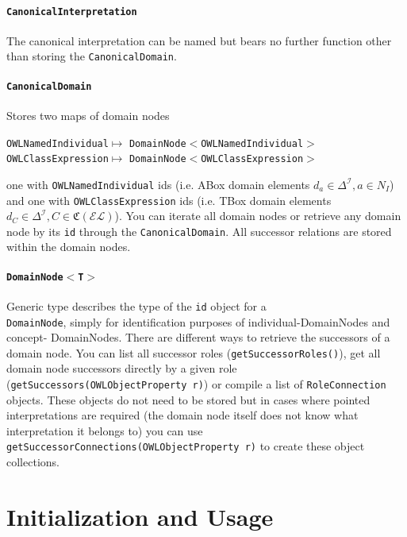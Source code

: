 \documentclass{article}
\newcommand{\EL}{\ensuremath{\mathcal{EL}}}
\newcommand{\C}{\ensuremath{\mathfrak{C}}}
\newcommand{\I}{\ensuremath{\mathcal{I}}}
\begin{document}
\paragraph{\texttt{CanonicalInterpretation}} The canonical interpretation can be
named but bears no further function other than storing the
\texttt{CanonicalDomain}.
\paragraph{\texttt{CanonicalDomain}} Stores two maps of domain nodes
\begin{center}
\texttt{OWLNamedIndividual}$\mapsto$
\texttt{DomainNode$<$OWLNamedIndividual$>$}\\
\texttt{OWLClassExpression}$\mapsto$ \texttt{DomainNode$<$OWLClassExpression$>$}
\end{center}
one with \texttt{OWLNamedIndividual} ids (i.e. ABox domain elements $d_a\in
\Delta^\I, a\in N_I$) and one with \texttt{OWLClassExpression} ids (i.e. TBox
domain elements $d_C\in \Delta^\I, C\in \C(\EL)$). You can iterate all domain
nodes or retrieve any domain node by its \texttt{id} through the
\texttt{CanonicalDomain}. All successor relations are stored within the domain
nodes.

\paragraph{\texttt{DomainNode$<$T$>$}} Generic type describes the type of the
\texttt{id} object for a\\ \texttt{DomainNode}, simply for identification
purposes of individual-DomainNodes and concept- DomainNodes. There are different
ways to retrieve the successors of a domain node. You can list all successor
roles (\texttt{getSuccessorRoles()}), get all domain node successors directly by
a given role (\texttt{getSuccessors(OWLObjectProperty r)}) or compile a list of
\texttt{RoleConnection} objects. These objects do not need to be stored but in
cases where pointed interpretations are required (the domain node itself does
not know what interpretation it belongs to) you can use\\
\texttt{getSuccessorConnections(OWLObjectProperty r)} to create these object
collections.

\section{Initialization and Usage}
\end{document}

